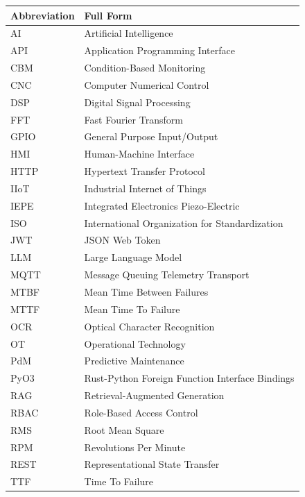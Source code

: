 \documentclass[12pt,a4paper,oneside]{report}
\begin{document}
\begin{table}[H]
\centering
\begin{tabular}{ll}
\toprule
\textbf{Abbreviation} & \textbf{Full Form} \\
\midrule
AI & Artificial Intelligence \\
API & Application Programming Interface \\
CBM & Condition-Based Monitoring \\
CNC & Computer Numerical Control \\
DSP & Digital Signal Processing \\
FFT & Fast Fourier Transform \\
GPIO & General Purpose Input/Output \\
HMI & Human-Machine Interface \\
HTTP & Hypertext Transfer Protocol \\
IIoT & Industrial Internet of Things \\
IEPE & Integrated Electronics Piezo-Electric \\
ISO & International Organization for Standardization \\
JWT & JSON Web Token \\
LLM & Large Language Model \\
MQTT & Message Queuing Telemetry Transport \\
MTBF & Mean Time Between Failures \\
MTTF & Mean Time To Failure \\
OCR & Optical Character Recognition \\
OT & Operational Technology \\
PdM & Predictive Maintenance \\
PyO3 & Rust-Python Foreign Function Interface Bindings \\
RAG & Retrieval-Augmented Generation \\
RBAC & Role-Based Access Control \\
RMS & Root Mean Square \\
RPM & Revolutions Per Minute \\
REST & Representational State Transfer \\
TTF & Time To Failure \\
\bottomrule
\end{tabular}
\end{table}

\newpage
\end{document}
